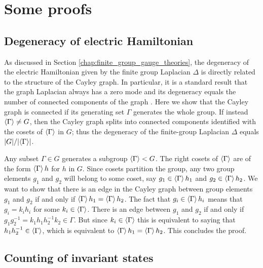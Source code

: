 \section{Some proofs}
\label{sec:some_proofs}

\subsection{Degeneracy of electric Hamiltonian}
\label{sec:laplacian degeneracy}

As discussed in Section \ref{chap:finite_group_gauge_theories}, the degeneracy of the electric Hamiltonian given by the finite group Laplacian $\Delta$ is directly related to the structure of the Cayley graph.
In particular, it is a standard result that the graph Laplacian always has a zero mode and its degeneracy equals the number of connected components of the graph \cite{spectralgraphtheory}.
Here we show that the Cayley graph is connected if its generating set $\Gamma$ generates the whole group.
If instead $\expval{\Gamma} \neq G$, then the Cayley graph splits into connected components identified with the cosets of $\expval{\Gamma}$ in $G$; thus the degeneracy of the finite-group Laplacian $\Delta$ equals $\abs{G}/\abs{\expval{\Gamma}}$.

Any subset $\Gamma \in G$ generates a subgroup $\expval{\Gamma} < G$.
The right cosets of $\expval{\Gamma}$ are of the form $\expval{\Gamma} h$ for $h$ in $G$.
Since cosets partition the group, any two group elements $g_1$ and $g_2$ will belong to some coset, say $g_1 \in \expval{\Gamma} h_1$ and $g_2 \in \expval{\Gamma} h_2$.
We want to show that there is an edge in the Cayley graph between group elements $g_1$ and $g_2$ if and only if $\expval{\Gamma} h_1 = \expval{\Gamma} h_2$.
The fact that $g_i \in \expval{\Gamma} h_i$ means that $g_i = k_i h_i$ for some $k_i \in \expval{\Gamma}$.
There is an edge between $g_1$ and $g_2$ if and only if $g_1 g_2^{-1} = k_1 h_1 h_2^{-1} k_2 \in \Gamma$.
But since $k_i \in \expval{\Gamma}$ this is equivalent to saying that $h_1 h_2^{-1} \in \expval{\Gamma}$, which is equivalent to $\expval{\Gamma} h_1 = \expval{\Gamma} h_2$.
This concludes the proof.


\subsection{Counting of invariant states}\label{sec:counting invariant states}

